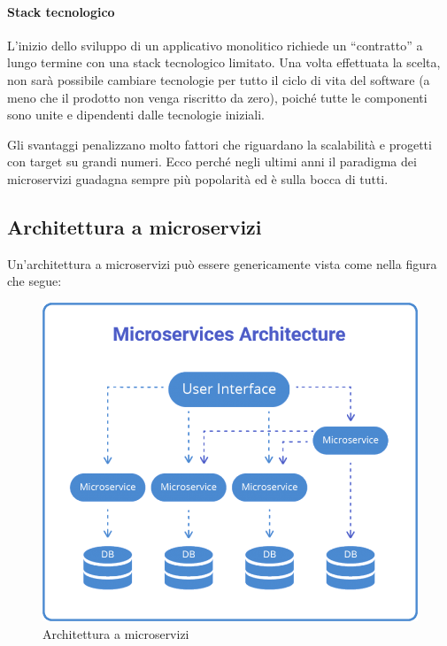 \paragraph*{Stack tecnologico} L'inizio dello sviluppo di un applicativo monolitico richiede un ``contratto'' a lungo termine con una stack tecnologico limitato. Una volta effettuata la scelta, non sarà possibile cambiare tecnologie per tutto il ciclo di vita del software (a meno che il prodotto non venga riscritto da zero), poiché tutte le componenti sono unite e dipendenti dalle tecnologie iniziali.

Gli svantaggi penalizzano molto fattori che riguardano la scalabilità
e progetti con target su grandi numeri.
Ecco perché negli ultimi anni il paradigma dei microservizi guadagna
sempre più popolarità ed è sulla bocca di tutti.



\subsection{Architettura a microservizi}

Un'architettura a microservizi può essere genericamente vista come
nella figura che segue:

\begin{figure}[H]
	\centering
	\includegraphics[width=\textwidth]{immagini/microservices_architecture.png} %
	\caption[Architettura a microservizi]{Architettura  a microservizi\footnotemark}
	\label{fig:microservices-arch}
\end{figure}

